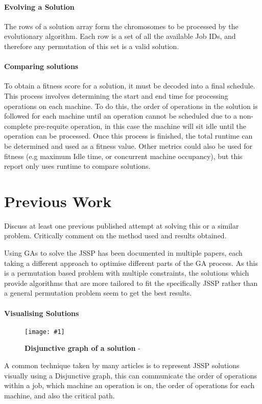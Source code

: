 \documentclass[14pt]{acmsiggraph}
\newcommand{\figuremacroWH}[4]{
	\begin{figure}[h!] %
		\centering
		\texttt{[image: \#1]}
		\caption[#2]{\textbf{#2} - #3}
		\label{fig:#1}
	\end{figure}
}
\begin{document}
\paragraph{Evolving a Solution}
The rows of a solution array form the chromosomes to be processed by the evolutionary algorithm. Each row is a set of all the available Job IDs, and therefore any permutation of this set is a valid solution. 

\paragraph{Comparing solutions}
To obtain a fitness score for a solution, it must be decoded into a final schedule. This process involves determining the start and end time for processing operations on each machine. To do this, the order of operations in the solution is followed for each machine until an operation cannot be scheduled due to a non-complete pre-requite operation, in this case the machine will sit idle until the operation can be processed. Once this process is finished, the total runtime can be determined and used as a fitness value. Other metrics could also be used for fitness (e.g maximum Idle time, or concurrent machine occupancy), but this report only uses runtime to compare solutions.

\section{Previous  Work}
Discuss at least one previous published attempt at solving this or a similar problem. 
Critically comment on the method used and results obtained.

Using GAs to solve the JSSP has been documented in multiple papers, each taking a different approach to optimise different parts of the GA process. As this is a permutation based problem with multiple constraints, the solutions which provide algorithms that are more tailored to fit the specifically JSSP rather than a general permutation problem seem to get the best results.

\paragraph{Visualising Solutions}
\figuremacroWH
{chart}
{Disjunctive graph of a solution}
{\cite{gao2011efficient}}
{1.0}

A common technique taken by many articles is to represent JSSP solutions visually using a Disjunctive graph, this can communicate the order of operations within a job, which machine an operation is on, the order of operations for each machine, and also the critical path.
\end{document}
